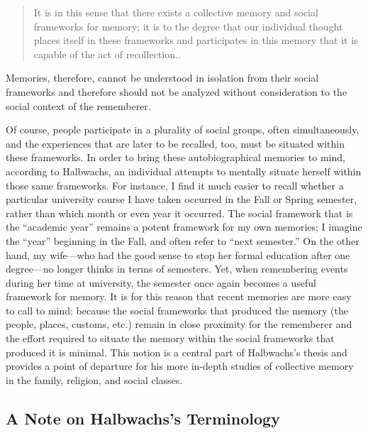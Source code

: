 \begin{quote}
It is in this sense that there exists a collective memory and social
frameworks for memory; it is to the degree that our individual thought
places itself in these frameworks and participates in this memory that
it is capable of the act of recollection.\autocite[38]{halbwachs1992}.
\end{quote}

Memories, therefore, cannot be understood in isolation from their social
frameworks and therefore should not be analyzed without consideration to
the social context of the rememberer.

Of course, people participate in a plurality of social groups, often
simultaneously, and the experiences that are later to be recalled, too,
must be situated within these frameworks. In order to bring these
autobiographical memories to mind, according to Halbwachs, an individual
attempts to mentally situate herself within those same frameworks. For
instance, I find it much easier to recall whether a particular
university course I have taken occurred in the Fall or Spring semester,
rather than which month or even year it occurred. The social framework
that is the ``academic year'' remains a potent framework for my own
memories; I imagine the ``year'' beginning in the Fall, and often refer
to ``next semester.'' On the other hand, my wife---who had the good
sense to stop her formal education after one degree---no longer thinks
in terms of semesters. Yet, when remembering events during her time at
university, the semester once again becomes a useful framework for
memory. It is for this reason that recent memories are more easy to call
to mind: because the social frameworks that produced the memory (the
people, places, customs, etc.) remain in close proximity for the
rememberer and the effort required to situate the memory within the
social frameworks that produced it is
minimal.\autocite[52]{halbwachs1992} This notion is a central part of
Halbwachs's thesis and provides a point of departure for his more
in-depth studies of collective memory in the family, religion, and
social classes.

\hypertarget{a-note-on-halbwachss-terminology}{%
\subsection{A Note on Halbwachs's
Terminology}\label{a-note-on-halbwachss-terminology}}

